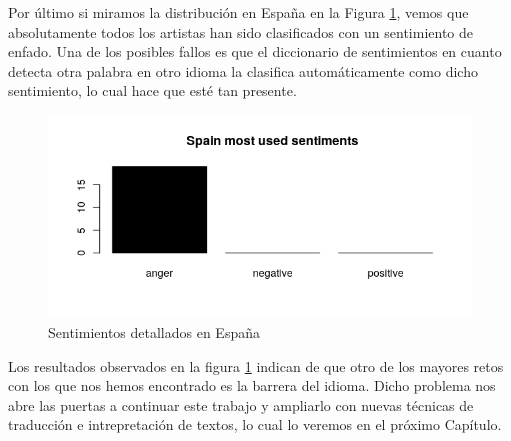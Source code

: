 Por último si miramos la distribución en España en la Figura \ref{fig:SpainSentiments}, vemos que absolutamente todos los artistas han sido clasificados con un sentimiento de enfado. Una de los posibles fallos es que el diccionario de sentimientos en cuanto detecta otra palabra en otro idioma la clasifica automáticamente como dicho sentimiento, lo cual hace que esté tan presente.

\begin{figure}[h]
	\centering
	\includegraphics[width=0.7\linewidth]{Imagenes/SpainSentiments}
	\caption{Sentimientos detallados en España}
	\label{fig:SpainSentiments}
\end{figure}

Los resultados observados en la figura \ref{fig:SpainSentiments} indican de que otro de los mayores retos con los que nos hemos encontrado es la barrera del idioma. Dicho problema nos abre las puertas a continuar este trabajo y ampliarlo con nuevas técnicas de traducción e intrepretación de textos, lo cual lo veremos en el próximo Capítulo.